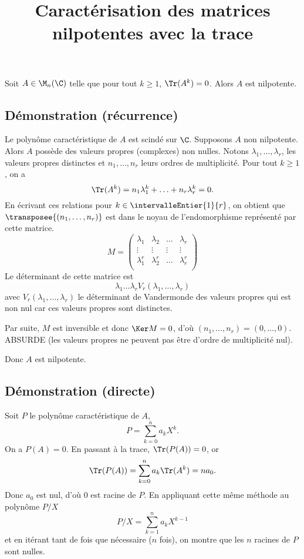 \documentclass[fontsize=12pt,twoside=false,parskip=half, french]{scrartcl}
\title{Caractérisation des matrices nilpotentes avec la trace}
\date{}
\author{}
\begin{document}
\maketitle
   \begin{Theoreme}
      Soit $A \in \M_n(\C)$ telle que pour tout $k \geq 1$, $\Tr(A^k) = 0$. Alors $A$ est nilpotente.
   \end{Theoreme}
   \subsection{Démonstration (récurrence)}
      Le polynôme caractéristique de $A$ est scindé sur $\C$. Supposons $A$ non nilpotente.
      Alors $A$ possède des valeurs propres (complexes) non nulles. Notons $\lambda_1, \ldots, \lambda_r$, 
      les valeurs propres distinctes et $n_1, \ldots, n_r$ leurs ordres de multiplicité.
      Pour tout $k \geq 1$, on a
      \[
         \Tr(A^k) = n_1 \lambda_1^k + \ldots + n_r \lambda_r^k = 0.
      \]
      En écrivant ces relations pour $k \in \intervalleEntier{1}{r}$, on obtient que $\transposee{(n_1, \ldots, n_r)}$
      est dans le noyau de l’endomorphisme représenté par cette matrice.
      \[M = \begin{pmatrix}
         \lambda_1   & \lambda_2 & \ldots  & \lambda_r   \\
         \vdots      & \vdots & \vdots  & \vdots      \\
         \lambda_1^r & \lambda_2^r & \ldots  & \lambda_r^r \\  
      \end{pmatrix}\]
      Le déterminant de cette matrice est  
      \[
         \lambda_1 \ldots \lambda_r V_r(\lambda_1, \ldots, \lambda_r)
      \]
      avec $V_r(\lambda_1, \ldots, \lambda_r)$ le déterminant de Vandermonde des valeurs propres qui est non nul 
      car ces valeurs propres sont distinctes.
      
      Par suite, $M$ est inversible et donc $\Ker M = {0}$, d’où $(n_1, \ldots, n_r) = (0, \ldots, 0)$.
      ABSURDE (les valeurs propres ne peuvent pas être d’ordre de multiplicité nul). 
      
      Donc $A$ est nilpotente.
  \subsection{Démonstration (directe)}
         Soit $P$ le polynôme caractéristique de $A$,
         \[
            P = \sum_{k = 0}^n a_k X^k.
         \]
         On a $P(A) = 0$. En passant à la trace, $\Tr(P(A)) = 0$, or
         \[
            \Tr(P(A)) = \sum_{k = 0}^n a_k \Tr(A^k) = na_0.
         \]
         Donc $a_0$ est nul, d’où $0$ est racine de $P$. En appliquant cette même méthode au polynôme $P/X$ 
         \[
            P/X = \sum_{k = 1}^n a_k X^{k-1}
         \]
         et en itérant tant de fois que nécessaire ($n$ fois), on montre que les $n$ racines de $P$ sont nulles.
\end{document}
